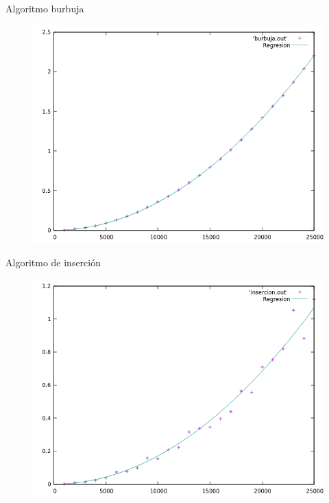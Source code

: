 \documentclass{beamer}
\begin{document}
\begin{frame}[fragile]{Algoritmo burbuja}
\begin{figure}[H]
\centering
\includegraphics[scale=0.5]{hibrida_burbuja.png}
\end{figure}
\end{frame}

\begin{frame}[fragile]{Algoritmo de inserción}
\begin{figure}[H]
\centering
\includegraphics[scale=0.5]{hibrida_insercion.png}
\end{figure}
\end{frame}
\end{document}

